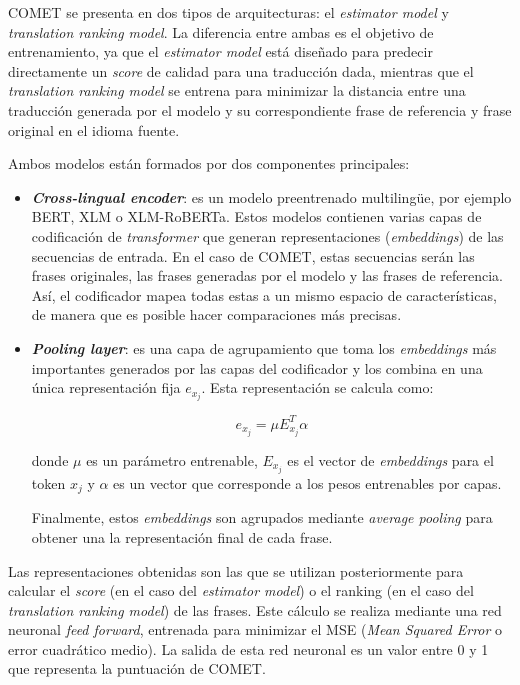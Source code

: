 \documentclass[11pt,spanish,listoffigures,listoftables]{tfgetsinf}
\begin{document}
COMET se presenta en dos tipos de arquitecturas: el \textit{estimator model} y \textit{translation ranking model}. La diferencia entre ambas es el objetivo de entrenamiento, ya que el \textit{estimator model} está diseñado para predecir directamente un \textit{score} de calidad para una traducción dada, mientras que el \textit{translation ranking model} se entrena para minimizar la distancia entre una traducción generada por el modelo y su correspondiente frase de referencia y frase original en el idioma fuente.

Ambos modelos están formados por dos componentes principales:

\begin{itemize}
	\item \textbf{\textit{Cross-lingual encoder}}: es un modelo preentrenado multilingüe, por ejemplo BERT, XLM o XLM-RoBERTa. Estos modelos contienen varias capas de codificación de \textit{transformer} que generan representaciones (\textit{embeddings}) de las secuencias de entrada. En el caso de COMET, estas secuencias serán las frases originales, las frases generadas por el modelo y las frases de referencia. Así, el codificador mapea todas estas a un mismo espacio de características, de manera que es posible hacer comparaciones más precisas.
	\item \textbf{\textit{Pooling layer}}: es una capa de agrupamiento que toma los \textit{embeddings} más importantes generados por las capas del codificador y los combina en una única representación fija $e_{x_j}$. Esta representación se calcula como:

\begin{equation}
e_{x_j} = \mu E_{x_j}^T \alpha
\end{equation}

donde $\mu$ es un parámetro entrenable, $E_{x_j}$ es el vector de \textit{embeddings} para el token $x_j$ y $\alpha$ es un vector que corresponde a los pesos entrenables por capas.

Finalmente, estos \textit{embeddings} son agrupados mediante \textit{average pooling} para obtener una la representación final de cada frase.
\end{itemize}

Las representaciones obtenidas son las que se utilizan posteriormente para calcular el \textit{score} (en el caso del \textit{estimator model}) o el ranking (en el caso del \textit{translation ranking model}) de las frases. Este cálculo se realiza mediante una red neuronal \textit{feed forward}, entrenada para minimizar el MSE (\textit{Mean Squared Error} o error cuadrático medio). La salida de esta red neuronal es un valor entre 0 y 1 que representa la puntuación de COMET.
\end{document}
